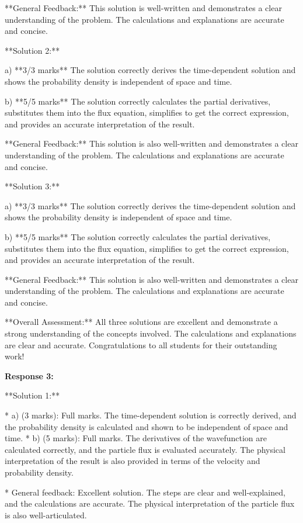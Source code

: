 \documentclass[a4paper,11pt]{article}
\begin{document}
**General Feedback:** This solution is well-written and demonstrates a clear understanding of the problem. The calculations and explanations are accurate and concise.

**Solution 2:**

a) **3/3 marks**
The solution correctly derives the time-dependent solution and shows the probability density is independent of space and time.

b) **5/5 marks**
The solution correctly calculates the partial derivatives, substitutes them into the flux equation, simplifies to get the correct expression, and provides an accurate interpretation of the result.

**General Feedback:** This solution is also well-written and demonstrates a clear understanding of the problem. The calculations and explanations are accurate and concise.

**Solution 3:**

a) **3/3 marks**
The solution correctly derives the time-dependent solution and shows the probability density is independent of space and time.

b) **5/5 marks**
The solution correctly calculates the partial derivatives, substitutes them into the flux equation, simplifies to get the correct expression, and provides an accurate interpretation of the result.

**General Feedback:** This solution is also well-written and demonstrates a clear understanding of the problem. The calculations and explanations are accurate and concise.

**Overall Assessment:** All three solutions are excellent and demonstrate a strong understanding of the concepts involved. The calculations and explanations are clear and accurate. Congratulations to all students for their outstanding work!


\textbf{Response 3:}

**Solution 1:**

* a) (3 marks): Full marks. The time-dependent solution is correctly derived, and the probability density is calculated and shown to be independent of space and time.
* b) (5 marks): Full marks. The derivatives of the wavefunction are calculated correctly, and the particle flux is evaluated accurately. The physical interpretation of the result is also provided in terms of the velocity and probability density.

* General feedback: Excellent solution. The steps are clear and well-explained, and the calculations are accurate. The physical interpretation of the particle flux is also well-articulated.
\end{document}
